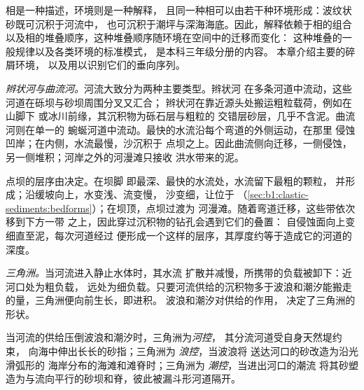 相是一种描述，环境则是一种解释，
且同一种相可以由若干种环境形成：波纹状砂既可沉积于河流中，
也可沉积于潮坪与深海海底。因此，解释依赖于相的组合
以及相的堆叠顺序，这种堆叠顺序随环境在空间中的迁移而变化：
这种堆叠的一般规律以及各类环境的标准模式，
是本科三年级分册的内容。
本章介绍主要的碎屑环境，
以及用以识别它们的垂向序列。

\emph{辫状河与曲流河。}河流大致分为两种主要类型。辫状河
在多条河道中流动，这些河道在砾坝与砂坝周围分叉又汇合；
辫状河在靠近源头处搬运粗粒载荷，例如在山脚下
或冰川前缘，其沉积物为砾石层与粗粒的
交错层砂层，几乎不含泥。曲流河则在单一的
蜿蜒河道中流动。最快的水流沿每个弯道的外侧运动，在那里
侵蚀凹岸；在内侧，水流最慢，沙沉积于
点坝之上。因此曲流侧向迁移，一侧侵蚀，
另一侧堆积；河岸之外的河漫滩只接收
洪水带来的泥。

点坝的层序由决定。在坝脚
即最深、最快的水流处，水流留下最粗的颗粒，
并形成；沿缓坡向上，水变浅、流变慢，
沙变细，让位于
（\cref{sec:b1:clastic-sediments:bedforms}）；在坝顶，点坝过渡为
河漫滩。随着弯道迁移，这些带依次移到下方一带
之上，因此穿过沉积物的钻孔会遇到它们的叠置：
自侵蚀面向上变细直至泥，每次河道经过
便形成一个这样的层序，其厚度约等于造成它的河道的深度。

\emph{三角洲。}当河流进入静止水体时，其水流
扩散并减慢，所携带的负载被卸下：近河口处为粗负载，
远处为细负载。只要河流供给的沉积物多于波浪和潮汐能搬走的量，三角洲便向前生长，即进积。
波浪和潮汐对供给的作用，
决定了三角洲的形状。

\begin{definition}[河控、浪控和潮控三角洲]\label{def:b1:clastic-sediments:delta}
当河流的供给压倒波浪和潮汐时，三角洲为\emph{河控}，
其分流河道受自身天然堤约束，
向海中伸出长长的砂指；三角洲为
\emph{浪控}，当波浪将
送达河口的砂改造为沿光滑弧形的
海岸分布的海滩和滩脊时；三角洲为
\emph{潮控}，当进出河口的潮流
将其砂塑造为与流向平行的砂坝和脊，彼此被漏斗形河道隔开。
\end{definition}

